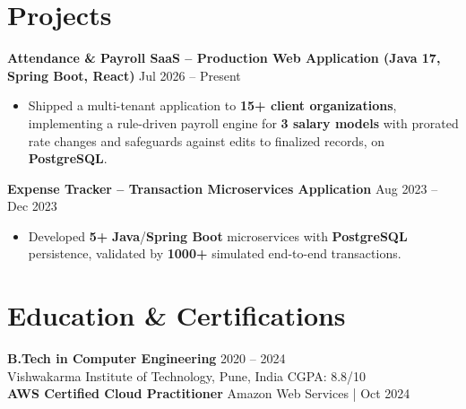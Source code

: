 \documentclass[a4paper,10pt]{article}
\begin{document}
\section*{Projects}

\textbf{Attendance \& Payroll SaaS -- Production Web Application (Java 17, Spring Boot, React)} \hfill Jul 2026 -- Present
\begin{itemize}[leftmargin=*]
    \item Shipped a multi-tenant application to \textbf{15+ client organizations}, implementing a rule-driven payroll engine for \textbf{3 salary models} with prorated rate changes and safeguards against edits to finalized records, on \textbf{PostgreSQL}.
\end{itemize}

\textbf{Expense Tracker -- Transaction Microservices Application} \hfill Aug 2023 -- Dec 2023
\begin{itemize}[leftmargin=*]
    \item Developed \textbf{5+} \textbf{Java}/\textbf{Spring Boot} microservices with \textbf{PostgreSQL} persistence, validated by \textbf{1000+} simulated end-to-end transactions.
\end{itemize}

\section*{Education \& Certifications}
\textbf{B.Tech in Computer Engineering} \hfill 2020 -- 2024 \\
Vishwakarma Institute of Technology, Pune, India \hfill CGPA: 8.8/10 \\
\textbf{AWS Certified Cloud Practitioner} \hfill Amazon Web Services \;|\; Oct 2024
\end{document}
